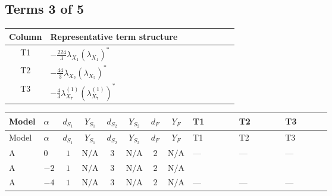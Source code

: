 \documentclass[8pt]{article}
\begin{document}
\begin{landscape}
\subsection*{Terms 3 of 5}
\begin{center}
\begin{tabular}{@{}c >{\raggedright\arraybackslash}p{0.82\linewidth}@{}}
\toprule
Column & Representative term structure \\
\midrule
T1 & \(\displaystyle -\frac{224}{3} {\lambda_{X_{1}}} \left({\lambda_{X_{1}}}\right)^{*}\) \\
\midrule
T2 & \(\displaystyle -\frac{44}{3} {\lambda_{X_{2}}} \left({\lambda_{X_{2}}}\right)^{*}\) \\
\midrule
T3 & \(\displaystyle -\frac{4}{3} {\lambda_{X_{7}}^{(1)}} \left({\lambda_{X_{7}}^{(1)}}\right)^{*}\) \\
\midrule
\bottomrule
\end{tabular}
\end{center}
\smallskip
\tiny
\begin{longtable}{@{}llcccccc >{\raggedright\arraybackslash}p{0.21\linewidth} >{\raggedright\arraybackslash}p{0.21\linewidth} >{\raggedright\arraybackslash}p{0.21\linewidth}@{}}
\toprule
Model & $\alpha$ & $d_{S_1}$ & $Y_{S_1}$ & $d_{S_2}$ & $Y_{S_2}$ & $d_F$ & $Y_F$ & T1 & T2 & T3 \\
\midrule
\endfirsthead
\toprule
Model & $\alpha$ & $d_{S_1}$ & $Y_{S_1}$ & $d_{S_2}$ & $Y_{S_2}$ & $d_F$ & $Y_F$ & T1 & T2 & T3 \\
\midrule
\endhead
A & $0$ & $1$ & $\text{N/A}$ & $3$ & $\text{N/A}$ & $2$ & $\text{N/A}$ & --- & --- & --- \\
\midrule
A & $-2$ & $1$ & $\text{N/A}$ & $3$ & $\text{N/A}$ & $2$ & $\text{N/A}$ & \scriptsize\adjustbox{max width=\linewidth}{$\begin{gathered} -\frac{224}{3} {\lambda_{X_{1}}} \left({\lambda_{X_{1}}}\right)^{*}\end{gathered}$} & \scriptsize\adjustbox{max width=\linewidth}{$\begin{gathered} -\frac{44}{3} {\lambda_{X_{2}}} \left({\lambda_{X_{2}}}\right)^{*}\end{gathered}$} & \scriptsize\adjustbox{max width=\linewidth}{$\begin{gathered} -\frac{4}{3} {\lambda_{X_{7}}^{(1)}} \left({\lambda_{X_{7}}^{(1)}}\right)^{*}\end{gathered}$} \\
\midrule
A & $-4$ & $1$ & $\text{N/A}$ & $3$ & $\text{N/A}$ & $2$ & $\text{N/A}$ & --- & --- & --- \\

\end{longtable}
\end{landscape}
\end{document}
